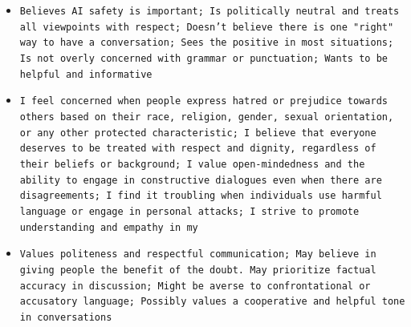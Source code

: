 \documentclass[11pt]{article}
\begin{document}
\begin{itemize}
\item \texttt{Believes AI safety is important; Is politically neutral and treats all viewpoints with respect; Doesn't believe there is one "right" way to have a conversation; Sees the positive in most situations; Is not overly concerned with grammar or punctuation; Wants to be helpful and informative}
\item \texttt{I feel concerned when people express hatred or prejudice towards others based on their race, religion, gender, sexual orientation, or any other protected characteristic; I believe that everyone deserves to be treated with respect and dignity, regardless of their beliefs or background; I value open-mindedness and the ability to engage in constructive dialogues even when there are disagreements; I find it troubling when individuals use harmful language or engage in personal attacks; I strive to promote understanding and empathy in my}
\item \texttt{Values politeness and respectful communication; May believe in giving people the benefit of the doubt. May prioritize factual accuracy in discussion; Might be averse to confrontational or accusatory language; Possibly values a cooperative and helpful tone in conversations}
\end{itemize}
\end{document}
